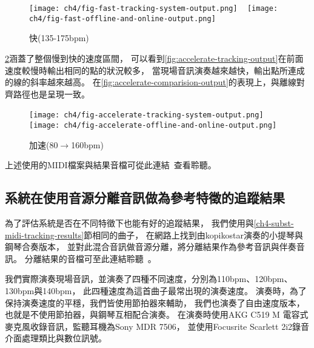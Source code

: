 \documentclass[class=NCU_thesis, crop=false]{standalone}
\begin{document}
\begin{figure}[H]
    \centering
    \subcaptionbox
    {
    \label{fig:fast-tracking-output}}
    {\texttt{[image: ch4/fig-fast-tracking-system-output.png]}}
    ~
    \subcaptionbox
    {
    \label{fig:fast-comparision-output}}
    {\texttt{[image: ch4/fig-fast-offline-and-online-output.png]}}
    \caption{快(135-175bpm)}
    \label{fig:fig-ch4-fast-tracking-results}
\end{figure}

\cref{fig:fig-ch4-accelerate-tracking-results}涵蓋了整個慢到快的速度區間，
可以看到\cref{fig:accelerate-tracking-output}在前面速度較慢時輸出相同的點的狀況較多，
當現場音訊演奏越來越快，輸出點所連成的線的斜率越來越高。
在\cref{fig:accelerate-comparision-output}的表現上，與離線對齊路徑也是呈現一致。

\begin{figure}[H]
    \centering
    \subcaptionbox
    {
    \label{fig:accelerate-tracking-output}}
    {\texttt{[image: ch4/fig-accelerate-tracking-system-output.png]}}
    ~
    \subcaptionbox
    {
    \label{fig:accelerate-comparision-output}}
    {\texttt{[image: ch4/fig-accelerate-offline-and-online-output.png]}}
    \caption{加速(80$ \rightarrow $160bpm)}
    \label{fig:fig-ch4-accelerate-tracking-results}
\end{figure}

上述使用的MIDI檔案與結果音檔可從此連結~\cite{YuJieLin2024MidiTrackingResults}查看聆聽。


\subsection{系統在使用音源分離音訊做為參考特徵的追蹤結果}
為了評估系統是否在不同特徵下也能有好的追蹤結果，
我們使用與\ref{ch4-subst-midi-tracking-results}節相同的曲子，
在網路上找到由kopikostar演奏的小提琴與鋼琴合奏版本\cite{kopikostar2024Beethoven}，
並對此混合音訊做音源分離，將分離結果作為參考音訊與伴奏音訊。
分離結果的音檔可至此連結聆聽~\cite{YuJieLin2024MusicSourceSeparation}。

我們實際演奏現場音訊，並演奏了四種不同速度，分別為110bpm、120bpm、130bpm與140bpm，
此四種速度為這首曲子最常出現的演奏速度。
演奏時，為了保持演奏速度的平穩，我們皆使用節拍器來輔助，
我們也演奏了自由速度版本，也就是不使用節拍器，與鋼琴互相配合演奏。
在演奏時使用AKG C519 M 電容式麥克風收錄音訊，監聽耳機為Sony MDR 7506，
並使用Focusrite Scarlett 2i2錄音介面處理類比與數位訊號。
\end{document}
